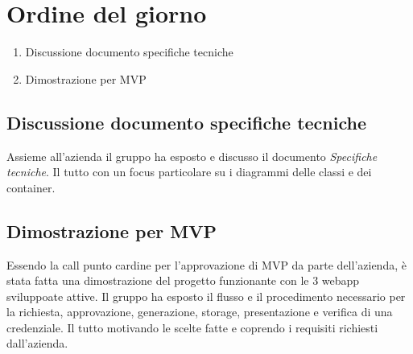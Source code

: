 \section{Ordine del giorno}
\begin{enumerate}
\item Discussione documento specifiche tecniche
\item Dimostrazione per MVP 
\end{enumerate}

\subsection{Discussione documento specifiche tecniche} 
Assieme all'azienda il gruppo ha esposto e discusso il documento \textit{Specifiche tecniche}. Il tutto con un focus particolare su i diagrammi delle classi e dei container.
\subsection{Dimostrazione per MVP}
Essendo la call punto cardine per l'approvazione di MVP da parte dell'azienda, è stata fatta una dimostrazione del progetto funzionante con le 3 webapp sviluppoate attive. Il gruppo ha esposto il flusso e il procedimento necessario per la richiesta, approvazione, generazione, storage, presentazione e verifica di una credenziale.
Il tutto motivando le scelte fatte e coprendo i requisiti richiesti dall'azienda.
